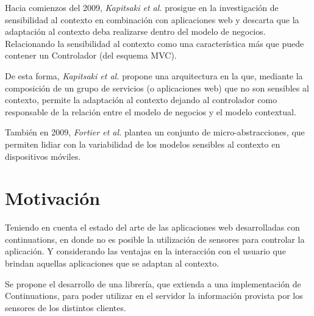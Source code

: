 Hacia comienzos del 2009, \emph{Kapitsaki et al.} prosigue en la investigación de sensibilidad al contexto en combinación con aplicaciones web y descarta que la adaptación al contexto deba realizarse dentro del modelo de negocios. Relacionando la sensibilidad al contexto como una característica más que puede contener un Controlador (del esquema MVC)\cite{Kapitsaki09}.

De esta forma, \emph{Kapitsaki et al.} propone una arquitectura en la que, mediante la composición de un grupo de servicios (o aplicaciones web) que no son sensibles al contexto, permite la adaptación al contexto dejando al controlador como responsable de la relación entre el modelo de negocios y el modelo contextual.

También en 2009, \emph{Fortier et al.} plantea un conjunto de micro-abstracciones, que permiten lidiar con la variabilidad de los modelos sensibles al contexto en dispositivos móviles\cite{Fortier09}.


\section{Motivación}



Teniendo en cuenta el estado del arte de las aplicaciones web desarrolladas con continuations, en donde no es posible la utilización de sensores para controlar la aplicación. Y considerando las ventajas en la interacción con el usuario que brindan aquellas aplicaciones que se adaptan al contexto.


Se propone el desarrollo de una librería, que extienda a una implementación de Continuations, para poder utilizar en el servidor la información provista por los sensores de los distintos clientes.


